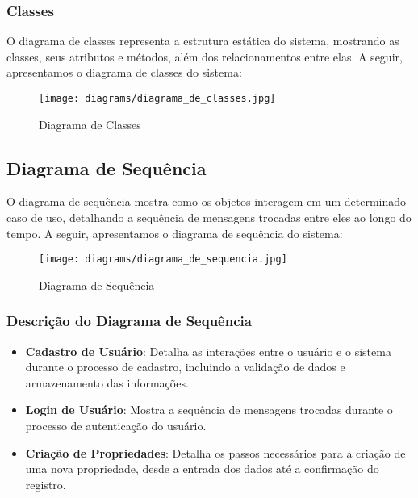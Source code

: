 \documentclass[../main.tex]{subfiles}
\begin{document}
\subsubsection{Classes}
O diagrama de classes representa a estrutura estática do sistema, mostrando as classes, seus atributos e métodos, além dos relacionamentos entre elas. A seguir, apresentamos o diagrama de classes do sistema:

\vspace{3cm}
\begin{figure}[htbp]
    \centering
    \texttt{[image: diagrams/diagrama\_de\_classes.jpg]}
    \caption{Diagrama de Classes}
    \label{fig:diagrama-de-classes}
\end{figure}
\newpage
\subsection{Diagrama de Sequência}
O diagrama de sequência mostra como os objetos interagem em um determinado caso de uso, detalhando a sequência de mensagens trocadas entre eles ao longo do tempo. A seguir, apresentamos o diagrama de sequência do sistema:

\vspace{3cm}
\begin{figure}[htbp]
    \centering
    \texttt{[image: diagrams/diagrama\_de\_sequencia.jpg]}
    \caption{Diagrama de Sequência}
    \label{fig:diagrama-de-sequencia}
\end{figure}

\subsubsection{Descrição do Diagrama de Sequência}
\begin{itemize}
    \item \textbf{Cadastro de Usuário}: Detalha as interações entre o usuário e o sistema durante o processo de cadastro, incluindo a validação de dados e armazenamento das informações.
    \item \textbf{Login de Usuário}: Mostra a sequência de mensagens trocadas durante o processo de autenticação do usuário.
    \item \textbf{Criação de Propriedades}: Detalha os passos necessários para a criação de uma nova propriedade, desde a entrada dos dados até a confirmação do registro.
\end{itemize}


\end{document}
